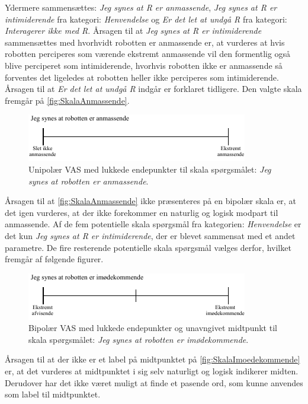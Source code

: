 Ydermere sammensættes: \textit{Jeg synes at R er anmassende}, \textit{Jeg synes at R er intimiderende} fra kategori: \textit{Henvendelse} og \textit{Er det let at undgå R} fra kategori: \textit{Interagerer ikke med R}. Årsagen til at \textit{Jeg synes at R er intimiderende} sammensættes med hvorhvidt robotten er anmassende er, at vurderes at hvis robotten perciperes som værende ekstremt anmassende vil den formentlig også blive perciperet som intimiderende, hvorhvis robotten ikke er anmassende så forventes det ligeledes at robotten heller ikke perciperes som intimiderende. Årsagen til at \textit{Er det let at undgå R} indgår er forklaret tidligere. Den valgte skala fremgår på \autoref{fig:SkalaAnmassende}.  
%
\begin{figure}[H]
\centering
\includegraphics[width =\textwidth]{Figure/UdvalgteSkalaer/Anmassende} 
\caption{Unipolær VAS med lukkede endepunkter til skala spørgsmålet: \textit{Jeg synes at robotten er anmassende}.}
\label{fig:SkalaAnmassende}
\end{figure}
\noindent
%
Årsagen til at \autoref{fig:SkalaAnmassende} ikke præsenteres på en bipolær skala er, at det igen vurderes, at der ikke forekommer en naturlig og logisk modpart til anmassende. Af de fem potentielle skala spørgsmål fra kategorien: \textit{Henvendelse} er det kun \textit{Jeg synes at R er intimiderende}, der er blevet sammensat med et andet parametre. De fire resterende potentielle skala spørgsmål vælges derfor, hvilket fremgår af følgende figurer.    
%
\begin{figure}[H]
\centering
\includegraphics[width =\textwidth]{Figure/UdvalgteSkalaer/Imoedekommende} 
\caption{Bipolær VAS med lukkede endepunkter og unavngivet midtpunkt til skala spørgsmålet: \textit{Jeg synes at robotten er imødekommende}.}
\label{fig:SkalaImoedekommende}
\end{figure}
\noindent
%
Årsagen til at der ikke er et label på midtpunktet på \autoref{fig:SkalaImoedekommende} er, at det vurderes at midtpunktet i sig selv naturligt og logisk indikerer midten. Derudover har det ikke været muligt at finde et pasende ord, som kunne anvendes som label til midtpunktet.  
